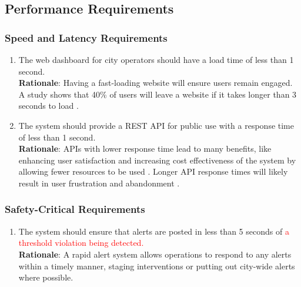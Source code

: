 \documentclass[]{article}
\begin{document}


\subsection{Performance Requirements}
\label{sub:performance_requirements}

\subsubsection{Speed and Latency Requirements}
\label{ssub:speed_and_latency_requirements}
\begin{enumerate}[{PR-SL}1.]
	\item The web dashboard for city operators should have a load time of less than 1 second. \\
    \textbf{Rationale}: Having a fast-loading website will ensure users remain engaged. A study shows that 40\% of users will leave a website if it takes longer than 3 seconds to load \cite{browserstack}.
    
    \item The system should provide a REST API for public use with a response time of less than 1 second. \\
    \textbf{Rationale}: APIs with lower response time lead to many benefits, like enhancing user satisfaction and increasing cost effectiveness of the system by allowing fewer resources to be used  \cite{farouk2024}. Longer API response times will likely result in user frustration and abandonment \cite{farouk2024}.
\end{enumerate}

\subsubsection{Safety-Critical Requirements}
\label{ssub:safety_critical_requirements}
\begin{enumerate}[{PR-SC}1. ]
	\item The system should ensure that alerts are posted in less than 5 seconds of \textcolor{red}{a threshold violation being detected.}\\
    \textbf{Rationale}: A rapid alert system allows operations to respond to any alerts within a timely manner, staging interventions or putting out city-wide alerts where possible. \textcolor{red}{\cite{PRSC1}}
\end{enumerate}
\end{document}
